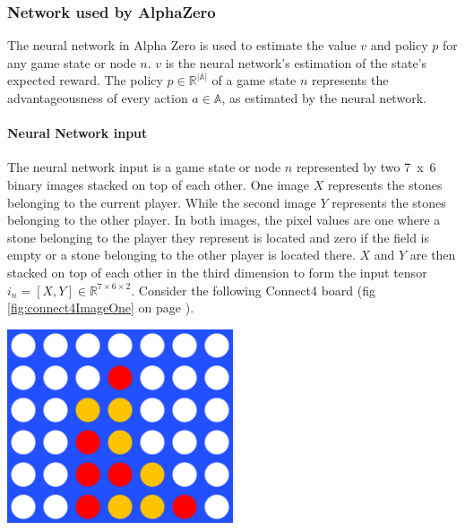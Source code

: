 \documentclass[12pt]{article}
\newcommand{\imgRef}[1]{(fig \ref{#1} on page \pageref{#1})}
\begin{document}
\subsubsection{Network used by AlphaZero}
The neural network in Alpha Zero is used to estimate the value \(v\) and policy \(p\) for any game state or node \(n\). \(v\) is the neural network's estimation of the state's expected reward. The policy \(p \in\mathbb{R}^{|\mathbb{A}|}\) of a game state \(n\) represents the advantageousness of every action \(a\in\mathbb{A}\), as estimated by the neural network.
\paragraph{Neural Network input}
The neural network input is a game state or node \(n\) represented by two \mbox{7 x 6} binary images stacked on top of each other. One image \(X\) represents the stones belonging to the current player. While the second image \(Y\) represents the stones belonging to the other player. In both images, the pixel values are one where a stone belonging to the player they represent is located and zero if the field is empty or a stone belonging to the other player is located there. \(X\) and \(Y\) are then stacked on top of each other in the third dimension to form the input tensor \(i_n = [X, Y] \in \mathbb{R}^{7 \times 6 \times 2}\).
Consider the following Connect4 board \imgRef{fig:connect4ImageOne}.

\begin{center}
\includegraphics[width=0.5\textwidth]{connectFourExample}
\label{fig:connect4ImageOne}
\end{center}
\end{document}
